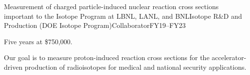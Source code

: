 \begin{rSubsection}{Measurement of charged particle-induced nuclear
reaction cross sections important to the Isotope Program at LBNL, LANL, and BNL}{\textnormal{Isotope R\&D and Production (DOE Isotope Program)}}{Collaborator}{FY19--FY23}
\item    Five years at \$750,000.
\item Our goal is to measure proton-induced reaction cross sections for the accelerator-driven production of radioisotopes for medical and national security applications.

\end{rSubsection}


